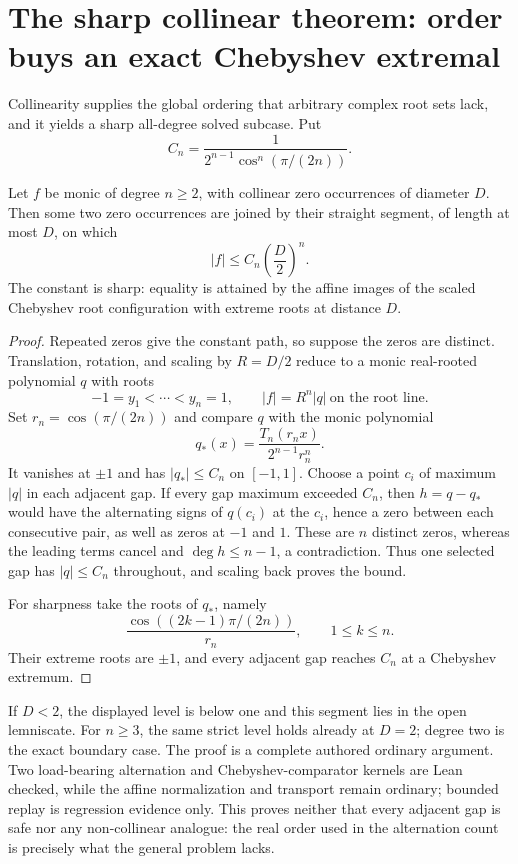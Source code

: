 \documentclass[11pt]{article}
\begin{document}
\section{The sharp collinear theorem: order buys an exact Chebyshev extremal}
\label{sec:collinear}

Collinearity supplies the global ordering that arbitrary complex root sets
lack, and it yields a sharp all-degree solved subcase.  Put
\[
 C_n=\frac{1}{2^{n-1}\cos^n(\pi/(2n))}.
\]

\begin{theorem}
\label{res:sharp-collinear-root-diameter}
Let $f$ be monic of degree $n\ge2$, with collinear zero occurrences of diameter
$D$.  Then some two zero occurrences are joined by their straight segment,
of length at most $D$, on which
\[
 |f|\le C_n\left(\frac D2\right)^n.
\]
The constant is sharp: equality is attained by the affine images of the
scaled Chebyshev root configuration with extreme roots at distance $D$.
\end{theorem}

\begin{proof}
Repeated zeros give the constant path, so suppose the zeros are distinct.
Translation, rotation, and scaling by $R=D/2$ reduce to a monic real-rooted
polynomial $q$ with roots
\[
 -1=y_1<\cdots<y_n=1,
 \qquad |f|=R^n|q|\ \text{on the root line}.
\]
Set $r_n=\cos(\pi/(2n))$ and compare $q$ with the monic polynomial
\[
 q_*(x)=\frac{T_n(r_nx)}{2^{n-1}r_n^n}.
\]
It vanishes at $\pm1$ and has $|q_*|\le C_n$ on $[-1,1]$.  Choose a point
$c_i$ of maximum $|q|$ in each adjacent gap.  If every gap maximum exceeded
$C_n$, then $h=q-q_*$ would have the alternating signs of $q(c_i)$ at the
$c_i$, hence a zero between each consecutive pair, as well as zeros at
$-1$ and $1$.  These are $n$ distinct zeros, whereas the leading terms cancel
and $\deg h\le n-1$, a contradiction.  Thus one selected gap has
$|q|\le C_n$ throughout, and scaling back proves the bound.

For sharpness take the roots of $q_*$, namely
\[
 \frac{\cos((2k-1)\pi/(2n))}{r_n},\qquad 1\le k\le n.
\]
Their extreme roots are $\pm1$, and every adjacent gap reaches $C_n$ at a
Chebyshev extremum.
\end{proof}

If $D<2$, the displayed level is below one and this segment lies in the open
lemniscate.  For $n\ge3$, the same strict level holds already at $D=2$;
degree two is the exact boundary case.  The proof is a complete authored
ordinary argument.  Two load-bearing alternation and Chebyshev-comparator
kernels are Lean checked, while the affine normalization and transport remain
ordinary; bounded replay is regression evidence only.  This proves neither
that every adjacent gap is safe nor any non-collinear analogue: the real order
used in the alternation count is precisely what the general problem lacks.
\end{document}
